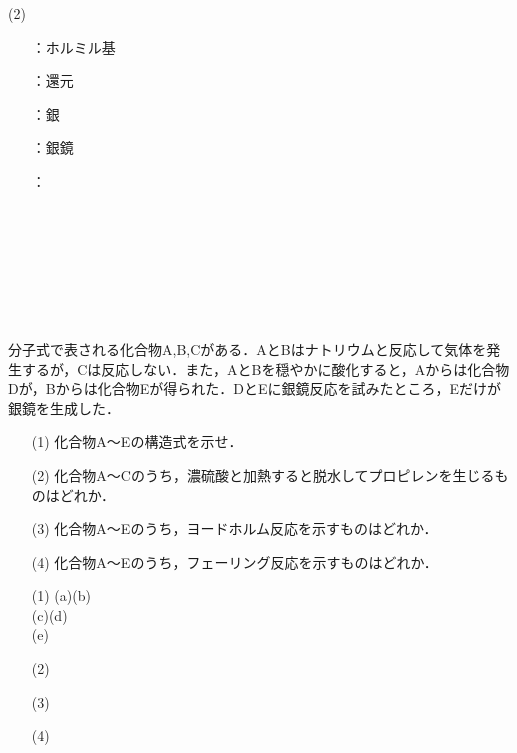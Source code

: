 \documentclass[a4paper,12pt]{ltjsreport}
\begin{document}
\begin{minipage}{0.5\linewidth}
\noindent (2)
\begin{itemize}
    \item[\fbox{コ}]：ホルミル基\\
      \item [\fbox{サ}]：還元\\
  \item [\fbox{シ}]：銀\\
  \item [\fbox{ス}]：銀鏡\\
    \item [　]：\\
  \item [　]　\\
  \item [　]　\\
  \item [　]　\\
  \item [　]　
\end{itemize}
\end{minipage}
\newpage
\begin{que}
分子式で表される化合物A,B,Cがある．AとBはナトリウムと反応して気体を発生するが，Cは反応しない．また，AとBを穏やかに酸化すると，Aからは化合物Dが，Bからは化合物Eが得られた．DとEに銀鏡反応を試みたところ，Eだけが銀鏡を生成した．
\begin{itemize}
    \item [(1)]化合物A〜Eの構造式を示せ．
    \item [(2)]化合物A〜Cのうち，濃硫酸と加熱すると脱水してプロピレンを生じるものはどれか．
    \item [(3)]化合物A〜Eのうち，ヨードホルム反応を示すものはどれか．
    \item [(4)]化合物A〜Eのうち，フェーリング反応を示すものはどれか．
\end{itemize}
\end{que}
\ans 
\begin{itemize}
    \item[(1)](a)\hspace{180pt}(b)\\[70pt]
         (c)\hspace{180pt}(d)\\[70pt]
            (e)\\
    \item[(2)]　\\[20pt]
    \item[(3)]　\\[20pt]
    \item[(4)]　\\[20pt]
\end{itemize}
\end{document}
